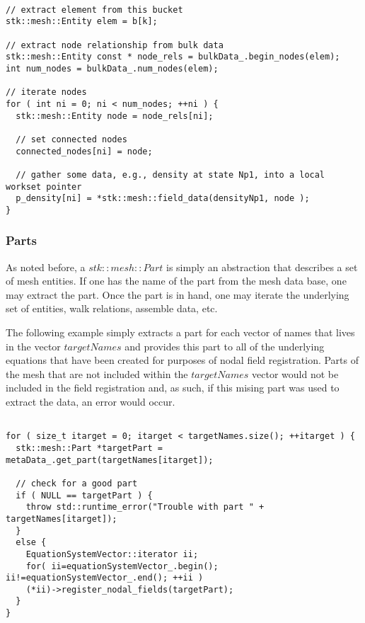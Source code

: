 \begin{lstlisting}

// extract element from this bucket
stk::mesh::Entity elem = b[k];

// extract node relationship from bulk data
stk::mesh::Entity const * node_rels = bulkData_.begin_nodes(elem);
int num_nodes = bulkData_.num_nodes(elem);

// iterate nodes
for ( int ni = 0; ni < num_nodes; ++ni ) {
  stk::mesh::Entity node = node_rels[ni];
  
  // set connected nodes
  connected_nodes[ni] = node;
  
  // gather some data, e.g., density at state Np1, into a local workset pointer
  p_density[ni] = *stk::mesh::field_data(densityNp1, node );
}

\end{lstlisting}

\subsubsection{Parts}
As noted before, a $stk::mesh::Part$ is simply an abstraction that describes a 
set of mesh entities. If one has the name of the part from the mesh data base,
one may extract the part. Once the part is in hand, one may iterate the underlying set of
entities, walk relations, assemble data, etc.

The following example simply extracts a part for each vector of names that lives in
the vector $targetNames$ and provides this part to all of the underlying equations
that have been created for purposes of nodal field registration. Parts of the mesh
that are not included within the $targetNames$ vector would not be included in the 
field registration and, as such, if this mising part was used to extract the data, an 
error would occur.

\begin{lstlisting}

for ( size_t itarget = 0; itarget < targetNames.size(); ++itarget ) {
  stk::mesh::Part *targetPart = metaData_.get_part(targetNames[itarget]);

  // check for a good part
  if ( NULL == targetPart ) {
    throw std::runtime_error("Trouble with part " + targetNames[itarget]);
  }
  else {
    EquationSystemVector::iterator ii;
    for( ii=equationSystemVector_.begin(); ii!=equationSystemVector_.end(); ++ii )
    (*ii)->register_nodal_fields(targetPart);
  }
}

\end{lstlisting}

